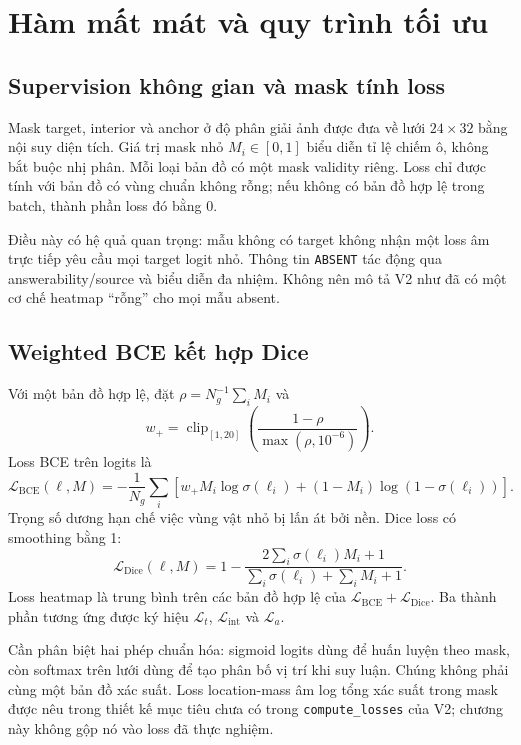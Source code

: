 \section{Hàm mất mát và quy trình tối ưu}
\label{sec:method-loss}

\subsection{Supervision không gian và mask tính loss}

Mask target, interior và anchor ở độ phân giải ảnh được đưa về
lưới $24\times32$ bằng nội suy diện tích. Giá trị mask nhỏ
$M_i\in[0,1]$ biểu diễn tỉ lệ chiếm ô, không bắt buộc nhị phân.
Mỗi loại bản đồ có một mask validity riêng. Loss chỉ được
tính với bản đồ có vùng chuẩn không rỗng; nếu không có bản đồ
hợp lệ trong batch, thành phần loss đó bằng 0.

Điều này có hệ quả quan trọng: mẫu không có target không nhận
một loss âm trực tiếp yêu cầu mọi target logit nhỏ.
Thông tin \texttt{ABSENT} tác động qua answerability/source
và biểu diễn đa nhiệm. Không nên mô tả V2 như đã có một cơ chế
heatmap “rỗng” cho mọi mẫu absent.

\subsection{Weighted BCE kết hợp Dice}

Với một bản đồ hợp lệ, đặt $\rho=N_g^{-1}\sum_iM_i$ và
\begin{equation}
    w_+=\operatorname{clip}_{[1,20]}
    \left(\frac{1-\rho}{\max(\rho,10^{-6})}\right).
\end{equation}
Loss BCE trên logits là
\begin{equation}
    \mathcal{L}_{\mathrm{BCE}}(\ell,M)=
    -\frac{1}{N_g}\sum_i
    \left[
    w_+M_i\log\sigma(\ell_i)
    +(1-M_i)\log(1-\sigma(\ell_i))
    \right].
\end{equation}
Trọng số dương hạn chế việc vùng vật nhỏ bị lấn át bởi nền.
Dice loss có smoothing bằng 1:
\begin{equation}
    \mathcal{L}_{\mathrm{Dice}}(\ell,M)=
    1-
    \frac{2\sum_i\sigma(\ell_i)M_i+1}
    {\sum_i\sigma(\ell_i)+\sum_iM_i+1}.
\end{equation}
Loss heatmap là trung bình trên các bản đồ hợp lệ của
$\mathcal{L}_{\mathrm{BCE}}+\mathcal{L}_{\mathrm{Dice}}$.
Ba thành phần tương ứng được ký hiệu
$\mathcal{L}_t$, $\mathcal{L}_{\mathrm{int}}$ và
$\mathcal{L}_a$.

Cần phân biệt hai phép chuẩn hóa: sigmoid logits dùng để
huấn luyện theo mask, còn softmax trên lưới dùng để tạo phân
bố vị trí khi suy luận. Chúng không phải cùng một bản đồ
xác suất. Loss location-mass âm log tổng xác suất trong
mask được nêu trong thiết kế mục tiêu chưa có trong
\texttt{compute\_losses} của V2; chương này không gộp nó
vào loss đã thực nghiệm.

